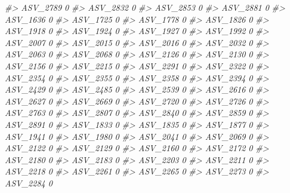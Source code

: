 \documentclass[
]{article}
\newenvironment{Shaded}{\begin{snugshade}}{\end{snugshade}}
\newcommand{\CommentTok}[1]{\textcolor[rgb]{0.56,0.35,0.01}{\textit{#1}}}
\begin{document}
\begin{Shaded}
\begin{Highlighting}[]
\CommentTok{\#\textgreater{} ASV\_2789  0}
\CommentTok{\#\textgreater{} ASV\_2832  0}
\CommentTok{\#\textgreater{} ASV\_2853  0}
\CommentTok{\#\textgreater{} ASV\_2881  0}
\CommentTok{\#\textgreater{} ASV\_1636  0}
\CommentTok{\#\textgreater{} ASV\_1725  0}
\CommentTok{\#\textgreater{} ASV\_1778  0}
\CommentTok{\#\textgreater{} ASV\_1826  0}
\CommentTok{\#\textgreater{} ASV\_1918  0}
\CommentTok{\#\textgreater{} ASV\_1924  0}
\CommentTok{\#\textgreater{} ASV\_1927  0}
\CommentTok{\#\textgreater{} ASV\_1992  0}
\CommentTok{\#\textgreater{} ASV\_2007  0}
\CommentTok{\#\textgreater{} ASV\_2015  0}
\CommentTok{\#\textgreater{} ASV\_2016  0}
\CommentTok{\#\textgreater{} ASV\_2032  0}
\CommentTok{\#\textgreater{} ASV\_2063  0}
\CommentTok{\#\textgreater{} ASV\_2068  0}
\CommentTok{\#\textgreater{} ASV\_2126  0}
\CommentTok{\#\textgreater{} ASV\_2130  0}
\CommentTok{\#\textgreater{} ASV\_2156  0}
\CommentTok{\#\textgreater{} ASV\_2215  0}
\CommentTok{\#\textgreater{} ASV\_2291  0}
\CommentTok{\#\textgreater{} ASV\_2322  0}
\CommentTok{\#\textgreater{} ASV\_2354  0}
\CommentTok{\#\textgreater{} ASV\_2355  0}
\CommentTok{\#\textgreater{} ASV\_2358  0}
\CommentTok{\#\textgreater{} ASV\_2394  0}
\CommentTok{\#\textgreater{} ASV\_2429  0}
\CommentTok{\#\textgreater{} ASV\_2485  0}
\CommentTok{\#\textgreater{} ASV\_2539  0}
\CommentTok{\#\textgreater{} ASV\_2616  0}
\CommentTok{\#\textgreater{} ASV\_2627  0}
\CommentTok{\#\textgreater{} ASV\_2669  0}
\CommentTok{\#\textgreater{} ASV\_2720  0}
\CommentTok{\#\textgreater{} ASV\_2726  0}
\CommentTok{\#\textgreater{} ASV\_2763  0}
\CommentTok{\#\textgreater{} ASV\_2807  0}
\CommentTok{\#\textgreater{} ASV\_2840  0}
\CommentTok{\#\textgreater{} ASV\_2859  0}
\CommentTok{\#\textgreater{} ASV\_2891  0}
\CommentTok{\#\textgreater{} ASV\_1833  0}
\CommentTok{\#\textgreater{} ASV\_1835  0}
\CommentTok{\#\textgreater{} ASV\_1877  0}
\CommentTok{\#\textgreater{} ASV\_1941  0}
\CommentTok{\#\textgreater{} ASV\_1980  0}
\CommentTok{\#\textgreater{} ASV\_2041  0}
\CommentTok{\#\textgreater{} ASV\_2069  0}
\CommentTok{\#\textgreater{} ASV\_2122  0}
\CommentTok{\#\textgreater{} ASV\_2129  0}
\CommentTok{\#\textgreater{} ASV\_2160  0}
\CommentTok{\#\textgreater{} ASV\_2172  0}
\CommentTok{\#\textgreater{} ASV\_2180  0}
\CommentTok{\#\textgreater{} ASV\_2183  0}
\CommentTok{\#\textgreater{} ASV\_2203  0}
\CommentTok{\#\textgreater{} ASV\_2211  0}
\CommentTok{\#\textgreater{} ASV\_2218  0}
\CommentTok{\#\textgreater{} ASV\_2261  0}
\CommentTok{\#\textgreater{} ASV\_2265  0}
\CommentTok{\#\textgreater{} ASV\_2273  0}
\CommentTok{\#\textgreater{} ASV\_2284  0}

\end{Highlighting}
\end{Shaded}
\end{document}
